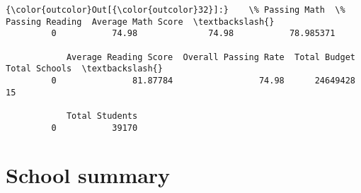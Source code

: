 \documentclass[11pt]{article}
\begin{document}
\begin{Verbatim}[commandchars=\\\{\}]
{\color{outcolor}Out[{\color{outcolor}32}]:}    \% Passing Math  \% Passing Reading  Average Math Score  \textbackslash{}
         0           74.98              74.98           78.985371   
         
            Average Reading Score  Overall Passing Rate  Total Budget  Total Schools  \textbackslash{}
         0               81.87784                 74.98      24649428             15   
         
            Total Students  
         0           39170  
\end{Verbatim}
            
    \section{School summary}\label{school-summary}
\end{document}
